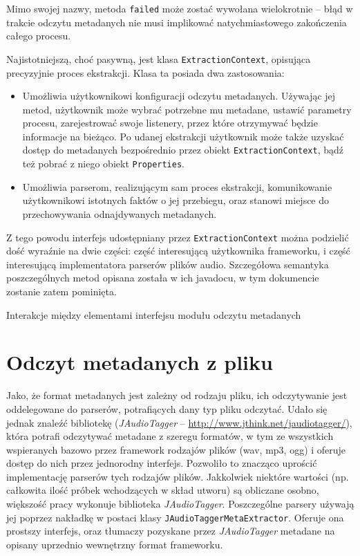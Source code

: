 \begin{Note}
Mimo swojej nazwy, metoda \texttt{failed} może zostać wywołana wielokrotnie -- błąd w trakcie
odczytu metadanych nie musi implikować natychmiastowego zakończenia całego procesu.
\end{Note}


Najistotniejszą, choć pasywną, jest klasa \texttt{ExtractionContext}, opisująca precyzyjnie proces
ekstrakcji. Klasa ta posiada dwa zastosowania:

\begin{itemize}
  \item Umożliwia użytkownikowi konfiguracji odczytu metadanych. Używając jej metod, użytkownik może
wybrać potrzebne mu metadane, ustawić parametry procesu, zarejestrować swoje listenery, przez które
otrzymywać będzie informacje na bieżąco. Po udanej ekstrakcji użytkownik może także uzyskać dostęp
do metadanych bezpośrednio przez obiekt \texttt{ExtractionContext}, bądź też pobrać z niego obiekt
\texttt{Properties}.

  \item Umożliwia parserom, realizującym sam proces ekstrakcji, komunikowanie użytkownikowi
istotnych faktów o jej przebiegu, oraz stanowi miejsce do przechowywania odnajdywanych metadanych.

\end{itemize}

Z tego powodu interfejs udostępniany przez \texttt{ExtractionContext} można podzielić dość wyraźnie
na dwie części: część interesującą użytkownika frameworku, i część interesującą implementatora
parserów plików audio. Szczegółowa semantyka poszczególnych metod opisana została w ich javadocu,
w tym dokumencie zostanie zatem pominięta.

{Interakcje między elementami interfejsu modułu odczytu metadanych}


\section{Odczyt metadanych z pliku}
\label{sec:metadane_odczyt}

Jako, że format metadanych jest zależny od rodzaju pliku, ich odczytywanie jest oddelegowane do
parserów, potrafiących dany typ pliku odczytać. Udało się jednak znaleźć bibliotekę
(\emph{JAudioTagger} -- \url{http://www.jthink.net/jaudiotagger/}), która potrafi odczytywać
metadane z szeregu formatów, w tym ze wszystkich wspieranych bazowo przez framework rodzajów plików
(wav, mp3, ogg) i oferuje dostęp do nich przez jednorodny interfejs. Pozwoliło to znacząco uprościć
implementację parserów tych rodzajów plików.  Jakkolwiek niektóre wartości (np. całkowita ilość
próbek wchodzących w skład utworu) są obliczane osobno, większość pracy wykonuje biblioteka
\emph{JAudioTagger}. Poszczególne parsery używają jej poprzez nakładkę w postaci klasy
\texttt{JAudioTaggerMetaExtractor}. Oferuje ona prostszy interfejs, oraz tłumaczy pozyskane przez
\emph{JAudioTagger} metadane na opisany uprzednio wewnętrzny format frameworku.


